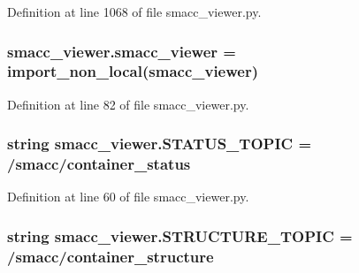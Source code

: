 Definition at line 1068 of file smacc\+\_\+viewer.\+py.

\subsubsection[{\texorpdfstring{smacc\+\_\+viewer}{smacc_viewer}}]{\setlength{\rightskip}{0pt plus 5cm}smacc\+\_\+viewer.\+smacc\+\_\+viewer = {\bf import\+\_\+non\+\_\+local}(\textquotesingle{}smacc\+\_\+viewer\textquotesingle{})}\hypertarget{namespacesmacc__viewer_a89075e0195ad90d6989e1113ff142923}{}\label{namespacesmacc__viewer_a89075e0195ad90d6989e1113ff142923}


Definition at line 82 of file smacc\+\_\+viewer.\+py.

\subsubsection[{\texorpdfstring{S\+T\+A\+T\+U\+S\+\_\+\+T\+O\+P\+IC}{STATUS_TOPIC}}]{\setlength{\rightskip}{0pt plus 5cm}string smacc\+\_\+viewer.\+S\+T\+A\+T\+U\+S\+\_\+\+T\+O\+P\+IC = \textquotesingle{}/smacc/container\+\_\+status\textquotesingle{}}\hypertarget{namespacesmacc__viewer_a399062d62c33f863e4c8116a962045a7}{}\label{namespacesmacc__viewer_a399062d62c33f863e4c8116a962045a7}


Definition at line 60 of file smacc\+\_\+viewer.\+py.

\subsubsection[{\texorpdfstring{S\+T\+R\+U\+C\+T\+U\+R\+E\+\_\+\+T\+O\+P\+IC}{STRUCTURE_TOPIC}}]{\setlength{\rightskip}{0pt plus 5cm}string smacc\+\_\+viewer.\+S\+T\+R\+U\+C\+T\+U\+R\+E\+\_\+\+T\+O\+P\+IC = \textquotesingle{}/smacc/container\+\_\+structure\textquotesingle{}}\hypertarget{namespacesmacc__viewer_a55bd549a019a8fb0e64d77136c1c8d4f}{}\label{namespacesmacc__viewer_a55bd549a019a8fb0e64d77136c1c8d4f}


